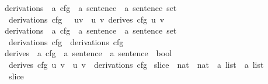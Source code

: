 \begin{isabellebody}
\ derivations{}\ {\isacharcolon}{\kern0pt}{\isacharcolon}{\kern0pt}\ {\isachardoublequoteopen}{\isacharprime}{\kern0pt}a\ cfg\ {\isasymRightarrow}\ {\isacharparenleft}{\kern0pt}{\isacharprime}{\kern0pt}a\ sentence\ {\isasymtimes}\ {\isacharprime}{\kern0pt}a\ sentence{\isacharparenright}{\kern0pt}\ set{\isachardoublequoteclose}\ \isanewline
\ \ {\isachardoublequoteopen}derivations{}\ cfg\ {\isacharequal}{\kern0pt}\ {\isacharbraceleft}{\kern0pt}\ {\isacharparenleft}{\kern0pt}u{\isacharcomma}{\kern0pt}v{\isacharparenright}{\kern0pt}\ {\isacharbar}{\kern0pt}\ u\ v{\isachardot}{\kern0pt}\ derives{}\ cfg\ u\ v\ {\isacharbraceright}{\kern0pt}{\isachardoublequoteclose}\isanewline
\isanewline
{}\isamarkupfalse%
\ derivations\ {\isacharcolon}{\kern0pt}{\isacharcolon}{\kern0pt}\ {\isachardoublequoteopen}{\isacharprime}{\kern0pt}a\ cfg\ {\isasymRightarrow}\ {\isacharparenleft}{\kern0pt}{\isacharprime}{\kern0pt}a\ sentence\ {\isasymtimes}\ {\isacharprime}{\kern0pt}a\ sentence{\isacharparenright}{\kern0pt}\ set{\isachardoublequoteclose}\ \ \isanewline
\ \ {\isachardoublequoteopen}derivations\ cfg\ {\isacharequal}{\kern0pt}\ {\isacharparenleft}{\kern0pt}derivations{}\ cfg{\isacharparenright}{\kern0pt}{\isacharcircum}{\kern0pt}{\isacharasterisk}{\kern0pt}{\isachardoublequoteclose}\isanewline
\isanewline
{}\isamarkupfalse%
\ derives\ {\isacharcolon}{\kern0pt}{\isacharcolon}{\kern0pt}\ {\isachardoublequoteopen}{\isacharprime}{\kern0pt}a\ cfg\ {\isasymRightarrow}\ {\isacharprime}{\kern0pt}a\ sentence\ {\isasymRightarrow}\ {\isacharprime}{\kern0pt}a\ sentence\ {\isasymRightarrow}\ bool{\isachardoublequoteclose}\ \isanewline
\ \ {\isachardoublequoteopen}derives\ cfg\ u\ v\ {\isacharequal}{\kern0pt}\ {\isacharparenleft}{\kern0pt}{\isacharparenleft}{\kern0pt}u{\isacharcomma}{\kern0pt}\ v{\isacharparenright}{\kern0pt}\ {\isasymin}\ derivations\ cfg{\isacharparenright}{\kern0pt}{\isachardoublequoteclose}\isanewline
\isanewline
{}\isamarkupfalse%
\ slice\ {\isacharcolon}{\kern0pt}{\isacharcolon}{\kern0pt}\ {\isachardoublequoteopen}nat\ {\isasymRightarrow}\ nat\ {\isasymRightarrow}\ {\isacharprime}{\kern0pt}a\ list\ {\isasymRightarrow}\ {\isacharprime}{\kern0pt}a\ list{\isachardoublequoteclose}\ \isanewline
\ \ {\isachardoublequoteopen}slice\ {\isacharunderscore}{\kern0pt}\ {\isacharunderscore}{\kern0pt}\ {\isacharbrackleft}{\kern0pt}{\isacharbrackright}{\kern0pt}\ {\isacharequal}{\kern0pt}\ {\isacharbrackleft}{\kern0pt}{\isacharbrackright}{\kern0pt}{\isachardoublequoteclose}\isanewline

\end{isabellebody}
